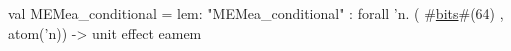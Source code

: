 val MEMea_conditional = {lem: "MEMea_conditional"} : forall 'n.
  ( #\hyperref[zbits]{bits}#(64) , atom('n)) -> unit effect { eamem }

